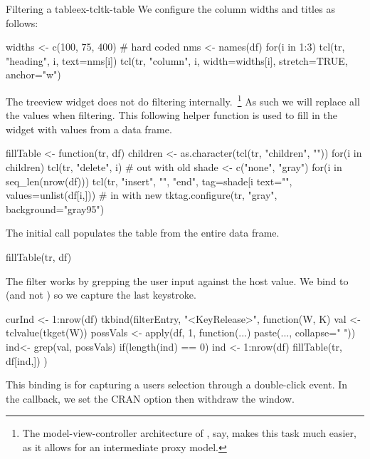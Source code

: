 \begin{example}{Filtering a table}{ex-tcltk-table}
We configure the column widths and titles as follows:
\begin{Schunk}
\begin{Sinput}
 widths <- c(100, 75, 400)            # hard coded
 nms <- names(df)
 for(i in 1:3) {
   tcl(tr, "heading", i, text=nms[i])
   tcl(tr, "column", i, width=widths[i], 
       stretch=TRUE, anchor="w")
 }
\end{Sinput}
\end{Schunk}
%
The treeview widget does not do filtering internally.~\footnote{The
  model-view-controller architecture of \GTK, say, makes this task
  much easier, as it allows for an intermediate proxy model.} As such
we will replace all the values when filtering.  This following helper
function is used to fill in the widget with values from a data frame.
\begin{Schunk}
\begin{Sinput}
 fillTable <- function(tr, df) {
   children <- as.character(tcl(tr, "children", ""))
   for(i in children) tcl(tr, "delete", i)    # out with old
   shade <- c("none", "gray")
   for(i in seq_len(nrow(df))) 
     tcl(tr, "insert", "", "end", tag=shade[i %
         text="",  
         values=unlist(df[i,]))               # in with new
   tktag.configure(tr, "gray", background="gray95")
 }
\end{Sinput}
\end{Schunk}
%
The initial call populates the table from the entire data frame.
\begin{Schunk}
\begin{Sinput}
 fillTable(tr, df)
\end{Sinput}
\end{Schunk}

The filter works by grepping the user input against the host value. We
bind to  (and not ) so we capture the last keystroke.
\begin{Schunk}
\begin{Sinput}
 curInd <- 1:nrow(df)
 tkbind(filterEntry, "<KeyRelease>", function(W, K) {
   val <- tclvalue(tkget(W))
   possVals <- apply(df, 1, function(...) 
                     paste(..., collapse=" "))
   ind<- grep(val, possVals)
   if(length(ind) == 0) ind <- 1:nrow(df)
   fillTable(tr, df[ind,])
 })
\end{Sinput}
\end{Schunk}
%
This binding is for capturing a users selection through a double-click
event. In the callback, we set the CRAN option then withdraw the window.
\begin{Schunk}
\end{Schunk}
\end{example}

